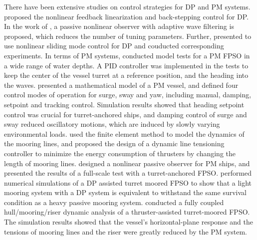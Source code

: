 \begin{sloppypar}
There have been extensive studies on control strategies for DP and PM systems. \cite{aarset1998nonlinear} proposed the nonlinear feedback linearization and back-stepping control for DP.  In the work of \cite{fossen1999passive}, a passive nonlinear observer with adaptive wave filtering is proposed, which reduces the number of tuning parameters. Further, \cite{tannuri2010dynamic} presented to use nonlinear sliding mode control for DP and couducted corresponding experiments. In terms of PM systems, \cite{aalbers1996hydrodynamic} conducted model tests for a PM FPSO in a wide range of water depths. A PID controller was implemented in the tests to keep the center of the vessel turret at a reference position, and the heading into the waves. \cite{strand1998design} presented a mathematical model of a PM vessel, and defined four control modes of operation for surge, sway and yaw, including manual, damping, setpoint and tracking control. Simulation results showed that heading setpoint control was crucial for turret-anchored ships, and damping control of surge and sway reduced oscillatory motions, which are induced by slowly varying environmental loads. \cite{aamo1999controlling} used the finite element method to model the dynamics of the mooring lines, and proposed the design of a dynamic line tensioning controller to minimize the energy consumption of thrusters by changing the length of mooring lines. \cite{sorensen1999thruster} designed a nonlinear passive observer for PM ships, and presented the results of a full-scale test with a turret-anchored FPSO. \cite{wichers1999benefits} performed numerical simulations of a DP assisted turret moored FPSO to show that a light mooring system with a DP system is equivalent to withstand the same survival condition as a heavy passive mooring system. \cite{ryu2003coupled} conducted a fully coupled hull/mooring/riser dynamic analysis of a thruster-assisted turret-moored FPSO. The simulation results showed that the vessel's horizontal-plane response and the tensions of mooring lines and the riser were greatly reduced by the PM system. 


\end{sloppypar}
